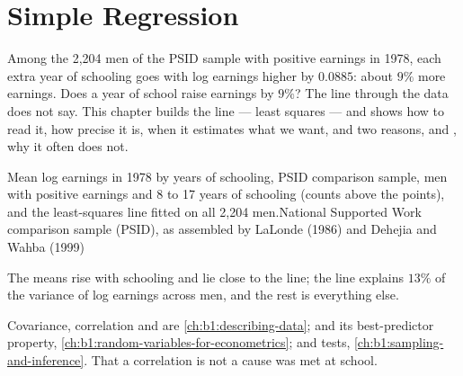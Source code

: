 \chapter{Simple Regression}\label{ch:b1:simple-regression}

Among the 2,204 men of the PSID sample with positive earnings in 1978, each
extra year of schooling goes with log earnings higher by $0.0885$: about $9\%$
more earnings. %
Does a year of school raise earnings by $9\%$? The line through the data does
not say. This chapter builds the line --- least squares --- and shows how to
read it, how precise it is, when it estimates what we want, and two
reasons,  and , why it often
does not.

\begin{openingchart}{Mean log earnings in 1978 by years of schooling, PSID comparison
sample, men with positive earnings and 8 to 17 years of schooling (counts
above the points), and the least-squares line fitted on all 2,204 men.}{National
Supported Work comparison sample (PSID), as assembled by LaLonde (1986) and Dehejia and Wahba (1999)}
\end{openingchart}

The means rise with schooling and lie close to the line; the line explains
$13\%$ of the variance of log earnings across men, and the rest is everything
else. %

\begin{recall}
Covariance, correlation and  are \cref{ch:b1:describing-data};
 and its best-predictor property,
\cref{ch:b1:random-variables-for-econometrics};  and tests, \cref{ch:b1:sampling-and-inference}.
That a correlation is not a cause was met at school.
\end{recall}

